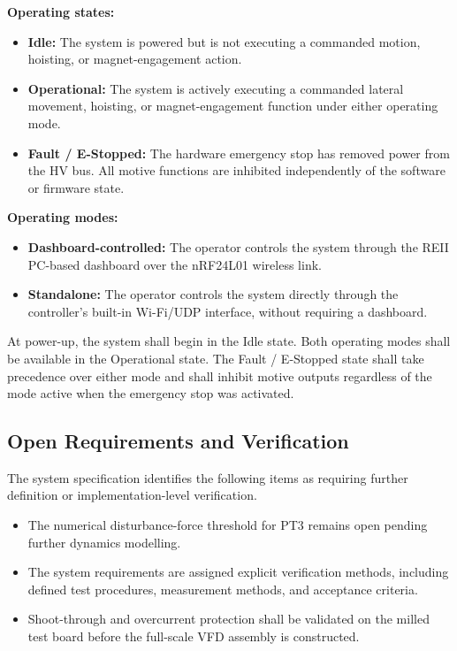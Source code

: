 \textbf{Operating states:}
\begin{itemize}
    \item \textbf{Idle:} The system is powered but is not
    executing a commanded motion, hoisting, or
    magnet-engagement action.

    \item \textbf{Operational:} The system is actively
    executing a commanded lateral movement, hoisting, or
    magnet-engagement function under either operating mode.

    \item \textbf{Fault / E-Stopped:} The hardware emergency
    stop has removed power from the HV bus. All motive
    functions are inhibited independently of the software
    or firmware state.
\end{itemize}

\textbf{Operating modes:}
\begin{itemize}
    \item \textbf{Dashboard-controlled:} The operator controls
    the system through the REII PC-based dashboard over the
    nRF24L01 wireless link.

    \item \textbf{Standalone:} The operator controls the system
    directly through the controller's built-in Wi-Fi/UDP
    interface, without requiring a dashboard.
\end{itemize}

At power-up, the system shall begin in the Idle state. Both
operating modes shall be available in the Operational state.
The Fault / E-Stopped state shall take precedence over either
mode and shall inhibit motive outputs regardless of the mode
active when the emergency stop was activated.


\subsection{Open Requirements and Verification}
\label{subsec:open-req-verification}

The system specification identifies the following items as
requiring further definition or implementation-level verification.

\begin{itemize}
    \item The numerical disturbance-force threshold for PT3
    remains open pending further dynamics modelling.


    \item The system requirements are assigned explicit
    verification methods, including defined test procedures,
    measurement methods, and acceptance criteria.

    \item Shoot-through and overcurrent protection shall be
    validated on the milled test board before the full-scale
    VFD assembly is constructed.
\end{itemize}

